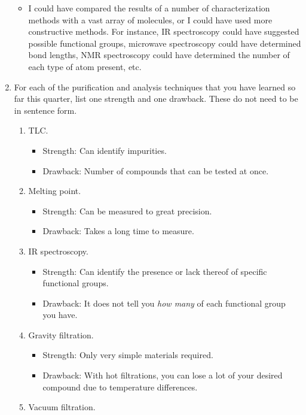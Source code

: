 \documentclass[titlepage]{article}
\begin{document}
\begin{enumerate}
\begin{itemize}
        \item I could have compared the results of a number of characterization methods with a vast array of molecules, or I could have used more constructive methods. For instance, IR spectroscopy could have suggested possible functional groups, microwave spectroscopy could have determined bond lengths, NMR spectroscopy could have determined the number of each type of atom present, etc.
    \end{itemize}
    \item For each of the purification and analysis techniques that you have learned so far this quarter, list one strength and one drawback. These do not need to be in sentence form.
    \begin{enumerate}
        \item TLC.
        \begin{itemize}
            \item Strength: Can identify impurities.
            \item Drawback: Number of compounds that can be tested at once.
        \end{itemize}
        \item Melting point.
        \begin{itemize}
            \item Strength: Can be measured to great precision.
            \item Drawback: Takes a long time to measure.
        \end{itemize}
        \item IR spectroscopy.
        \begin{itemize}
            \item Strength: Can identify the presence or lack thereof of specific functional groups.
            \item Drawback: It does not tell you \emph{how many} of each functional group you have.
        \end{itemize}
        \item Gravity filtration.
        \begin{itemize}
            \item Strength: Only very simple materials required.
            \item Drawback: With hot filtrations, you can lose a lot of your desired compound due to temperature differences.
        \end{itemize}
        \item Vacuum filtration.
        \begin{itemize}

\end{itemize}
\end{enumerate}
\end{enumerate}
\end{document}
